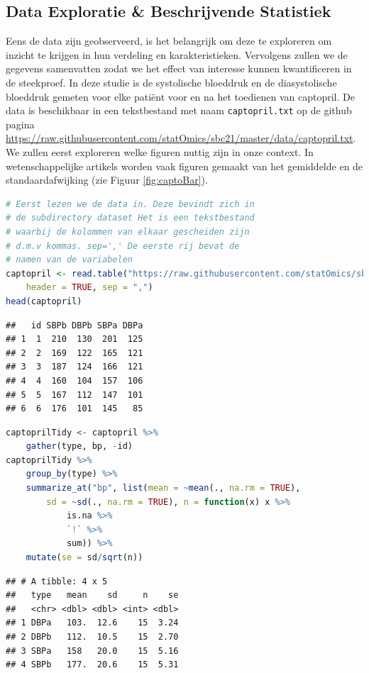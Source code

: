 \documentclass[
  12pt,dutch,coursenotes]{book}
\newcommand{\passthrough}[1]{#1}
\begin{document}
\hypertarget{data-exploratie-beschrijvende-statistiek}{%
\subsection{Data Exploratie \& Beschrijvende Statistiek}\label{data-exploratie-beschrijvende-statistiek}}

Eens de data zijn geobserveerd, is het belangrijk om deze te exploreren om inzicht te krijgen in hun verdeling en karakteristieken.
Vervolgens zullen we de gegevens samenvatten zodat we het effect van interesse kunnen kwantificeren in de steekproef.
In deze studie is de systolische bloeddruk en de diasystolische bloeddruk gemeten voor elke patiënt voor en na het toedienen van captopril.
De data is beschikbaar in een tekstbestand met naam \passthrough{\lstinline!captopril.txt!} op de github pagina \url{https://raw.githubusercontent.com/statOmics/sbc21/master/data/captopril.txt}.
We zullen eerst exploreren welke figuren nuttig zijn in onze context.
In wetenschappelijke artikels worden vaak figuren gemaakt van het gemiddelde en de standaardafwijking (zie Figuur \ref{fig:captoBar}).

\begin{lstlisting}[language=R]
# Eerst lezen we de data in. Deze bevindt zich in
# de subdirectory dataset Het is een tekstbestand
# waarbij de kolommen van elkaar gescheiden zijn
# d.m.v kommas. sep=',' De eerste rij bevat de
# namen van de variabelen
captopril <- read.table("https://raw.githubusercontent.com/statOmics/sbc21/master/data/captopril.txt",
    header = TRUE, sep = ",")
head(captopril)
\end{lstlisting}

\begin{lstlisting}
##   id SBPb DBPb SBPa DBPa
## 1  1  210  130  201  125
## 2  2  169  122  165  121
## 3  3  187  124  166  121
## 4  4  160  104  157  106
## 5  5  167  112  147  101
## 6  6  176  101  145   85
\end{lstlisting}

\begin{lstlisting}[language=R]
captoprilTidy <- captopril %>%
    gather(type, bp, -id)
captoprilTidy %>%
    group_by(type) %>%
    summarize_at("bp", list(mean = ~mean(., na.rm = TRUE),
        sd = ~sd(., na.rm = TRUE), n = function(x) x %>%
            is.na %>%
            `!` %>%
            sum)) %>%
    mutate(se = sd/sqrt(n))
\end{lstlisting}

\begin{lstlisting}
## # A tibble: 4 x 5
##   type   mean    sd     n    se
##   <chr> <dbl> <dbl> <int> <dbl>
## 1 DBPa   103.  12.6    15  3.24
## 2 DBPb   112.  10.5    15  2.70
## 3 SBPa   158   20.0    15  5.16
## 4 SBPb   177.  20.6    15  5.31
\end{lstlisting}
\end{document}
